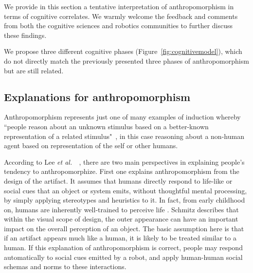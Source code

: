 \documentclass{frontiersSCNS} %
\newcommand{\etal}{{\textit{et al.~}}}
\begin{document}
We provide in this section a tentative interpretation of anthropomorphism in
terms of cognitive correlates. We warmly welcome the feedback and
comments from both the cognitive sciences and robotics communities to further
discuss these findings.

We propose three different cognitive phases (Figure~\ref{fig:cognitivemodel}),
which do not directly match the previously presented three phases of
anthropomorphism but are still related.


\subsection{Explanations for anthropomorphism}

Anthropomorphism represents just one of many examples of induction whereby
``people reason about an unknown stimulus based on a better-known representation
of a related stimulus"~\cite{epley_when_2008}, in this case reasoning about a
non-human agent based on representation of the self or other humans.

According to Lee \etal~\cite{lee_human_2005}, there are two main perspectives in
explaining people's tendency to anthropomorphize. First one explains
anthropomorphism from the design of the artifact. It assumes that humans
directly respond to life-like or social cues that an object or system emits,
without thoughtful mental processing, by simply applying stereotypes and
heuristics to it. In fact, from early childhood on, humans are inherently
well-trained to perceive life \cite{epley_seeing_2007}. Schmitz
\cite{schmitz_concepts_2011} describes that within the visual scope of design,
the outer appearance can have an important impact on the overall perception of
an object. The basic assumption here is that if an artifact appears much like a
human, it is likely to be treated similar to a human. If this explanation of
anthropomorphism is correct, people may respond automatically to social cues
emitted by a robot, and apply human-human social schemas and norms to these
interactions.
\end{document}

